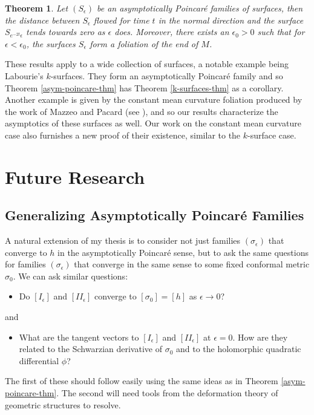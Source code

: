 \documentclass[11pt]{amsart}
\newtheorem{thm}{Theorem}[section]
\begin{document}
\begin{thm}
Let $(S_\epsilon)$ be an asymptotically Poincar\'e families of surfaces, then the distance between $S_\epsilon$ flowed for time $t$ in the normal direction and the surface $S_{e^{-2t}\epsilon}$ tends towards zero as $\epsilon$ does.
Moreover, there exists an $\epsilon_0 > 0$ such that for $\epsilon < \epsilon_0$, the surfaces $S_\epsilon$ form a foliation of the end of $M$.
\end{thm}

These results apply to a wide collection of surfaces, a notable example being Labourie's $k$-surfaces. 
They form an asymptotically Poincar\'e family and so Theorem \ref{asym-poincare-thm} has Theorem \ref{k-surfaces-thm} as a corollary. 
Another example is given by the constant mean curvature foliation produced by the work of Mazzeo and Pacard (see \cite{mazzeo-pacard2011}), and so our results characterize the asymptotics of these surfaces as well. 
Our work on the constant mean curvature case also furnishes a new proof of their existence, similar to the $k$-surface case.


\section{Future Research} \label{research plan}


\subsection{Generalizing Asymptotically Poincar\'e Families} \label{generalize families}
A natural extension of my thesis is to consider not just families $(\sigma_\epsilon)$ that converge to $h$ in the asymptotically Poincar\'e sense, but to ask the same questions for families $(\sigma_\epsilon)$ that converge in the same sense to some fixed conformal metric $\sigma_0$. 
We can ask similar questions:
\begin{itemize}
\item Do $[I_\epsilon]$ and $[I\!I_\epsilon]$ converge to $[\sigma_0] = [h]$ as $\epsilon \to 0$?
\end{itemize}
and 
\begin{itemize}
\item What are the tangent vectors to $[I_\epsilon]$ and $[I\!I_\epsilon]$ at $\epsilon =0$. 
How are they related to the Schwarzian derivative of $\sigma_0$ and to the holomorphic quadratic differential $\phi$? 
\end{itemize}
The first of these should follow easily using the same ideas as in Theorem \ref{asym-poincare-thm}. 
The second will need tools from the deformation theory of geometric structures to resolve. 
\end{document}
